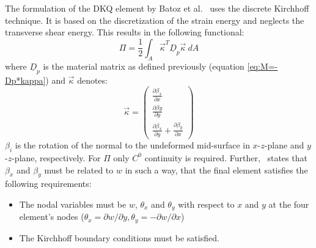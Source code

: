   The formulation of the DKQ element by Batoz et al.~\cite{batoz1982evaluation} uses the discrete Kirchhoff technique. It is based on the discretization of the strain energy and neglects the transverse shear energy. This results in the following functional:
  \begin{equation}
  \Pi = \frac{1}{2} \int_A \vec{\kappa}^T \underline{D}_p \vec{\kappa}\ d\!A
  \end{equation}
  where $\underline{D}_p$ is the material matrix as defined previously (equation \eqref{eq:M=-Dp*kappa}) and $\vec{\kappa}$ denotes:
  \begin{equation}
  \vec{\kappa} = \begin{pmatrix}
  \frac{\partial \beta_x}{\partial x}\\
  \frac{\partial \beta y}{\partial y}\\
  \frac{\partial \beta_x}{\partial y} + \frac{\partial \beta_y}{\partial x}
  \end{pmatrix}
  \end{equation}
  $\beta_i$ is the rotation of the normal to the undeformed mid-surface in $x$-$z$-plane and $y$-$z$-plane, respectively. For $\Pi$ only $C^0$ continuity is required. Further,~\cite{batoz1982evaluation} states that $\beta_x$ and $\beta_y$ must be related to $w$ in such a way, that the final element satisfies the following requirements:
  \begin{itemize}
  	\item The nodal variables must be $w$, $\theta_x$ and $\theta_y$ with respect to $x$ and $y$ at the four element's nodes ($\theta_x = \partial w/\partial y, \theta_y=-\partial w/\partial x$)
  	\item The Kirchhoff boundary conditions must be satisfied.
  \end{itemize}
      
